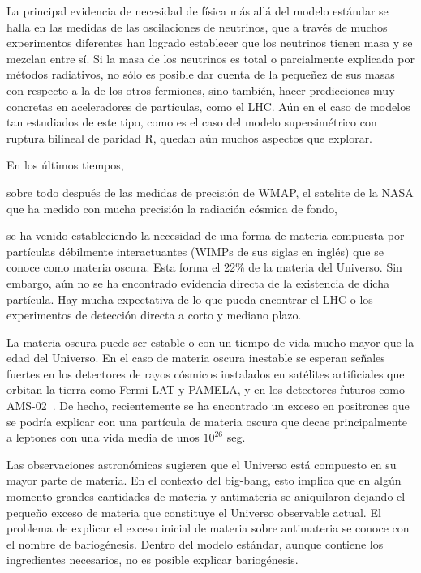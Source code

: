 La principal evidencia de necesidad de física más allá del modelo
estándar se halla en las medidas de las oscilaciones de neutrinos, que
a través de muchos experimentos diferentes han logrado establecer que
los neutrinos tienen masa y se mezclan entre sí. Si la masa de los
neutrinos es total o parcialmente explicada por métodos radiativos, no
sólo es posible dar cuenta de la pequeñez de sus masas con respecto a
la de los otros fermiones, sino también, hacer predicciones muy
concretas en aceleradores de partículas, como el LHC. Aún en el caso
de modelos tan estudiados de este tipo, como es el caso del modelo
supersimétrico con ruptura bilineal de paridad R, quedan aún muchos
aspectos que explorar.

En los últimos tiempos,
\begin{soloproyecto}
sobre todo después de las medidas de
precisión de WMAP, el satelite de la NASA que ha medido con mucha
precisión la radiación cósmica de fondo,  
\end{soloproyecto}
se ha venido estableciendo la
necesidad de una forma de materia compuesta por partículas débilmente
interactuantes (WIMPs de sus siglas en inglés) que se conoce como
materia oscura. Esta forma el 22\% de la materia del Universo. Sin
embargo, aún no se ha encontrado evidencia directa de la existencia de
dicha partícula. Hay mucha expectativa de lo que pueda encontrar el
LHC o los experimentos de detección directa a corto y mediano plazo.

La materia oscura puede ser estable o con un tiempo de vida mucho
mayor que la edad del Universo. En el caso de materia oscura inestable
se esperan señales fuertes en los detectores de rayos cósmicos
instalados en satélites artificiales que orbitan la tierra como
Fermi-LAT y PAMELA, y en los detectores futuros como
AMS-02~\cite{ams:2009}. De hecho, recientemente se ha encontrado un
exceso en positrones \cite{Adriani:2008zr} que se podría explicar con
una partícula de materia oscura que decae principalmente a leptones
con una vida media de unos $10^{26}$ seg.

Las observaciones astronómicas sugieren que el Universo está compuesto
en su mayor parte de materia. En el contexto del big-bang, esto
implica que en algún momento grandes cantidades de materia y
antimateria se aniquilaron dejando el pequeño exceso de materia que
constituye el Universo observable actual. El problema de explicar el
exceso inicial de materia sobre antimateria se conoce con el nombre de
bariogénesis. Dentro del modelo estándar, aunque contiene los
ingredientes necesarios, no es posible explicar bariogénesis.

